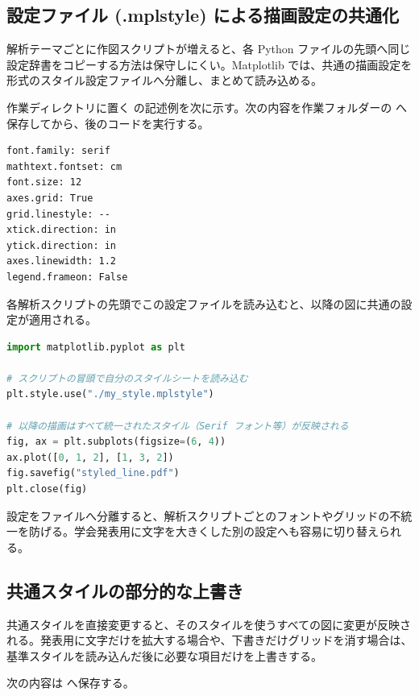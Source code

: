 \subsection{設定ファイル (.mplstyle) による描画設定の共通化}

解析テーマごとに作図スクリプトが増えると、各 Python ファイルの先頭へ同じ設定辞書をコピーする方法は保守しにくい。Matplotlib では、共通の描画設定を  形式のスタイル設定ファイルへ分離し、まとめて読み込める。

作業ディレクトリに置く  の記述例を次に示す。次の内容を作業フォルダーの  へ保存してから、後のコードを実行する。

\begin{lstlisting}[numbers=none, xleftmargin=2\zw]
font.family: serif
mathtext.fontset: cm
font.size: 12
axes.grid: True
grid.linestyle: --
xtick.direction: in
ytick.direction: in
axes.linewidth: 1.2
legend.frameon: False
\end{lstlisting}

各解析スクリプトの先頭でこの設定ファイルを読み込むと、以降の図に共通の設定が適用される。

\begin{lstlisting}[language=Python]
import matplotlib.pyplot as plt

# スクリプトの冒頭で自分のスタイルシートを読み込む
plt.style.use("./my_style.mplstyle")

# 以降の描画はすべて統一されたスタイル（Serif フォント等）が反映される
fig, ax = plt.subplots(figsize=(6, 4))
ax.plot([0, 1, 2], [1, 3, 2])
fig.savefig("styled_line.pdf")
plt.close(fig)
\end{lstlisting}

設定をファイルへ分離すると、解析スクリプトごとのフォントやグリッドの不統一を防げる。学会発表用に文字を大きくした別の設定へも容易に切り替えられる。

\subsection{共通スタイルの部分的な上書き}

共通スタイルを直接変更すると、そのスタイルを使うすべての図に変更が反映される。発表用に文字だけを拡大する場合や、下書きだけグリッドを消す場合は、基準スタイルを読み込んだ後に必要な項目だけを上書きする。

次の内容は  へ保存する。

